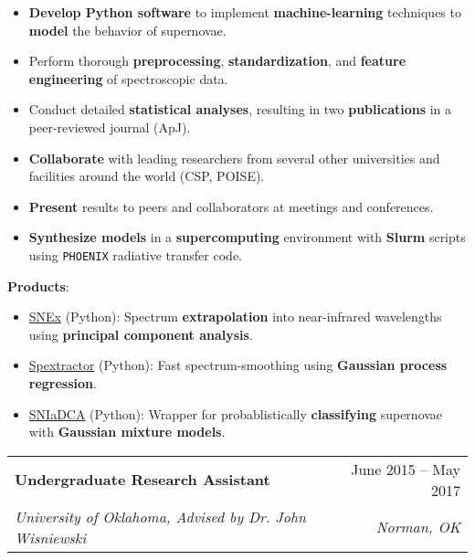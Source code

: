 \documentclass[letterpaper,11pt]{article}
\makeatletter
\newcommand{\smallHeading}[1]{\small{\textbf{#1}:\vspace{-5pt}}}
\newcommand{\resumeSubheading}[4]{
  \vspace{-1pt}\item
    \begin{tabular*}{0.97\textwidth}{l@{\extracolsep{\fill}}r}
      \textbf{#1} & #2 \\
      \textit{\small#3} & \textit{\small #4} \\
    \end{tabular*}\vspace{-5pt}
}
\newcommand{\emphasize}[1]{\textbf{#1}}
\makeatother
\begin{document}
    \begin{itemize}\small
      \item \emphasize{Develop Python software} to implement
        \emphasize{machine-learning} techniques to \emphasize{model} the
        behavior of supernovae.
      \item Perform thorough \emphasize{preprocessing},
        \emphasize{standardization}, and \emphasize{feature engineering} of
        spectroscopic data.
      \item Conduct detailed \emphasize{statistical analyses}, resulting in two
        \emphasize{publications} in a peer-reviewed journal (ApJ).
      \item \emphasize{Collaborate} with leading researchers from several other
        universities and facilities around the world (CSP, POISE).
      \item \emphasize{Present} results to peers and collaborators at meetings
        and conferences.
      \item \emphasize{Synthesize models} in a \emphasize{supercomputing}
        environment with \emphasize{Slurm} scripts using \texttt{PHOENIX}
        radiative transfer code.
    \end{itemize}
    \hspace*{1.1em}\smallHeading{Products}
    \begin{itemize}\small
      \item \href{https://github.com/anthonyburrow/SNEx}{SNEx} (Python):
        Spectrum \emphasize{extrapolation} into near-infrared wavelengths using
        \emphasize{principal component analysis}.
      \item \href{https://github.com/anthonyburrow/spextractor}{Spextractor} (Python):
        Fast spectrum-smoothing using \emphasize{Gaussian process regression}.
      \item \href{https://github.com/anthonyburrow/SNIaDCA}{SNIaDCA} (Python):
        Wrapper for probablistically \emphasize{classifying} supernovae with
        \emphasize{Gaussian mixture models}.
    \end{itemize}\vspace{-5pt}

  \normalsize
  \resumeSubheading
    {Undergraduate Research Assistant}{June 2015 -- May 2017}
    {University of Oklahoma, Advised by Dr. John Wisniewski}{Norman, OK}
\end{document}
